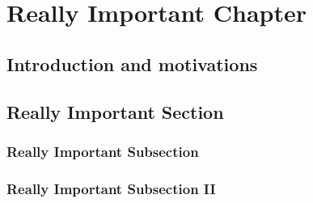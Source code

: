\documentclass[draft]{phd}
\begin{document}
	\chapter{Really Important Chapter}
	\label{chapSugra}
		\section{Introduction and motivations}

		\section{Really Important Section}
			\subsection{Really Important Subsection}
			\subsection{Really Important Subsection II}

\end{document}
